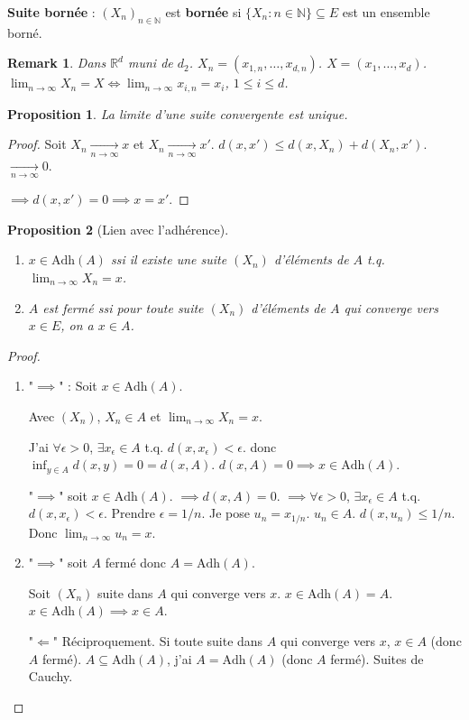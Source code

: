 \documentclass{article}
\newtheorem{proposition}{Proposition}
\newtheorem{remark}{Remark}
\begin{document}
\textbf{Suite bornée} : $(X_n)_{n \in \mathbb{N}}$ est \textbf{bornée} si $\{X_n : n \in \mathbb{N}\} \subseteq E$ est un ensemble borné.

\begin{remark}
Dans $\mathbb{R}^d$ muni de $d_2$.
$X_n = (x_{1, n}, \dots, x_{d, n})$.
$X = (x_1, \dots, x_d)$.
$\lim_{n \to \infty} X_n = X \iff \lim_{n \to \infty} x_{i, n} = x_i$, $1 \leq i \leq d$.
\end{remark}

\begin{proposition}
La limite d'une suite convergente est unique.
\end{proposition}

\begin{proof}
Soit $X_n \xrightarrow[n \to \infty]{} x$ et $X_n \xrightarrow[n \to \infty]{} x'$.
$d(x, x') \leq d(x, X_n) + d(X_n, x')$.
$\xrightarrow[n \to \infty]{} 0$.

$\implies d(x, x') = 0 \implies x = x'$.
\end{proof}

\begin{proposition}[Lien avec l'adhérence]
\begin{enumerate}
    \item $x \in \text{Adh}(A)$ ssi il existe une suite $(X_n)$ d'éléments de $A$ t.q. $\lim_{n \to \infty} X_n = x$.
    \item $A$ est fermé ssi pour toute suite $(X_n)$ d'éléments de $A$ qui converge vers $x \in E$, on a $x \in A$.
\end{enumerate}
\end{proposition}

\begin{proof}
\begin{enumerate}
    \item "$\implies$" : Soit $x \in \text{Adh}(A)$.

    Avec $(X_n)$, $X_n \in A$ et $\lim_{n \to \infty} X_n = x$.

    J'ai $\forall \epsilon > 0$, $\exists x_\epsilon \in A$ t.q. $d(x, x_\epsilon) < \epsilon$.
    donc $\inf_{y \in A} d(x, y) = 0 = d(x, A)$.
    $d(x, A) = 0 \implies x \in \text{Adh}(A)$.

    "$\implies$" soit $x \in \text{Adh}(A)$.
    $\implies d(x, A) = 0$.
    $\implies \forall \epsilon > 0$, $\exists x_\epsilon \in A$ t.q. $d(x, x_\epsilon) < \epsilon$.
    Prendre $\epsilon = 1/n$. Je pose $u_n = x_{1/n}$.
    $u_n \in A$. $d(x, u_n) \leq 1/n$. Donc $\lim_{n \to \infty} u_n = x$.

    \item "$\implies$" soit $A$ fermé donc $A = \text{Adh}(A)$.

    Soit $(X_n)$ suite dans $A$ qui converge vers $x$.
    $x \in \text{Adh}(A) = A$.
    $x \in \text{Adh}(A) \implies x \in A$.

    "$\Longleftarrow$" Réciproquement.
    Si toute suite dans $A$ qui converge vers $x$, $x \in A$ (donc $A$ fermé).
    $A \subseteq \text{Adh}(A)$, j'ai $A = \text{Adh}(A)$ (donc $A$ fermé).
    Suites de Cauchy.
\end{enumerate}
\end{proof}
\end{document}
